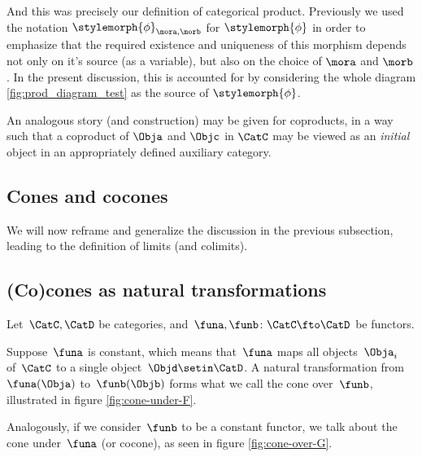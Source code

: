 And this was precisely our definition of categorical product.
Previously we used the notation $\stylemorph{\phi}_{\mora, \morb}$ for $\stylemorph{\phi}$ in order to emphasize that the required existence and uniqueness of this morphism depends not only on it's source (as a variable), but also on the choice of $\mora$ and $\morb$.
In the present discussion, this is accounted for by considering the whole diagram \cref{fig:prod_diagram_test} as the source of $\stylemorph{\phi}$.

\begin{remark}
    An analogous story (and construction) may be given for coproducts, in a way such that a coproduct of $\Obja$ and $\Objc$ in $\CatC$ may be viewed as an \emph{initial} object in an appropriately defined auxiliary category.
\end{remark}

\subsection{Cones and cocones}

We will now reframe and generalize the discussion in the previous subsection, leading to the definition of limits (and colimits).

\subsection{(Co)cones as natural transformations}

Let~$\CatC, \CatD$ be categories, and~$\funa, \funb\colon\CatC\fto\CatD$ be functors.

Suppose~$\funa$ is constant, which means that~$\funa$ maps all objects~$\Obja_i$ of~$\CatC$ to a single object~$\Objd \setin \CatD$.
A natural transformation from~$\funa(\Obja)$ to~$\funb(\Objb)$ forms what we call the cone over~$\funb$, illustrated in figure \cref{fig:cone-under-F}.

Analogously, if we consider~$\funb$ to be a constant functor, we talk about the cone under~$\funa$ (or cocone), as seen in figure \cref{fig:cone-over-G}.

\begin{marginfigure}
    \centering
    \caption{Cone over~$\funb$.
    }
    \label{fig:cone-over-G}
\end{marginfigure}

\begin{marginfigure}
    \centering
    \label{fig:cone-under-F}
    \caption{Cone under~$\funa$.}
\end{marginfigure}

